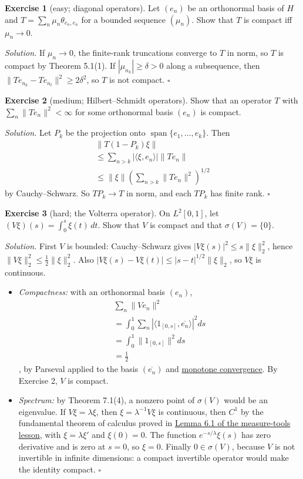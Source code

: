 \documentclass[
  english,
  11pt,
  a4paper,
]{article}
\providecommand{\tightlist}{%
  \setlength{\itemsep}{0pt}\setlength{\parskip}{0pt}}
\begin{document}
\textbf{Exercise 1} (easy; diagonal operators). Let \((e_n)\) be an
orthonormal basis of \(H\) and \(T=\sum_n\mu_n\theta_{e_n,e_n}\) for a
bounded sequence \((\mu_n)\). Show that \(T\) is compact iff
\(\mu_n\to0\).

\emph{Solution.} If \(\mu_n\to0\), the finite-rank truncations converge
to \(T\) in norm, so \(T\) is compact by Theorem 5.1(1). If
\(|\mu_{n_k}|\ge\delta>0\) along a subsequence, then
\(\|Te_{n_k}-Te_{n_l}\|^2\ge2\delta^2\), so \(T\) is not compact.
\(\square\)

\textbf{Exercise 2} (medium; Hilbert--Schmidt operators). Show that an
operator \(T\) with \(\sum_n\|Te_n\|^2<\infty\) for some orthonormal
basis \((e_n)\) is compact.

\emph{Solution.} Let \(P_k\) be the projection onto
\(\operatorname{span}\{e_1,\dots,e_k\}\). Then \[\begin{gathered}
\|T(1-P_k)\xi\|\\
\le\sum_{n>k}|\langle\xi,e_n\rangle|\|Te_n\|\\
\le\|\xi\|(\sum_{n>k}\|Te_n\|^2)^{1/2}
\end{gathered}\] by Cauchy--Schwarz. So \(TP_k\to T\) in norm, and each
\(TP_k\) has finite rank. \(\square\)

\textbf{Exercise 3} (hard; the Volterra operator). On \(L^2[0,1]\), let
\((V\xi)(s)=\int_0^s\xi(t)\,dt\). Show that \(V\) is compact and that
\(\sigma(V)=\{0\}\).

\emph{Solution.} First \(V\) is bounded: Cauchy--Schwarz gives
\(|V\xi(s)|^2\leq s\|\xi\|_2^2\), hence
\(\|V\xi\|_2^2\leq\frac12\|\xi\|_2^2\). Also
\(|V\xi(s)-V\xi(t)|\leq |s-t|^{1/2}\|\xi\|_2\), so \(V\xi\) is
continuous.

\begin{itemize}
\tightlist
\item
  \emph{Compactness:} with an orthonormal basis \((e_n)\),
  \[\begin{gathered}
  \sum_n\|Ve_n\|^2\\
  =\int_0^1\sum_n|\langle 1_{[0,s]},\overline{e_n}\rangle|^2ds\\
  =\int_0^1\|1_{[0,s]}\|^2ds\\
  =\frac12
  \end{gathered}\], by Parseval applied to the basis
  \((\overline{e_n})\) and
  \hyperref[measure-and-hilbert-space-tools--2-integration-and-convergence-without-countability-assumptions]{monotone
  convergence}. By Exercise 2, \(V\) is compact.
\item
  \emph{Spectrum:} by Theorem 7.1(4), a nonzero point of \(\sigma(V)\)
  would be an eigenvalue. If \(V\xi=\lambda\xi\), then
  \(\xi=\lambda^{-1}V\xi\) is continuous, then \(C^1\) by the
  fundamental theorem of calculus proved in
  \hyperref[measure-and-hilbert-space-tools--6-one-variable-integral-identities]{Lemma
  6.1 of the measure-tools lesson}, with \(\xi=\lambda\xi'\) and
  \(\xi(0)=0\). The function \(e^{-s/\lambda}\xi(s)\) has zero
  derivative and is zero at \(s=0\), so \(\xi=0\). Finally
  \(0\in\sigma(V)\), because \(V\) is not invertible in infinite
  dimensions: a compact invertible operator would make the identity
  compact. \(\square\)
\end{itemize}
\end{document}

